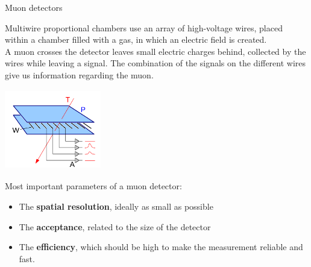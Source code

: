 \documentclass[8 pt]{beamer}
\begin{document}
\begin{frame}{Muon detectors}
\justifying
\begin{minipage}[c]{.58\textwidth}
\justifying
Multiwire proportional chambers use an array of high-voltage wires, placed within a chamber filled with a gas, in which an electric field is created. \\ \vspace{10pt}
A muon crosses the detector leaves small electric charges behind, collected by the wires while leaving a signal. The combination of the signals on the different wires give us information regarding the muon.
\end{minipage} \hfill
\begin{minipage}[c]{.39\textwidth}
\includegraphics[width=4.2cm, height=3.5cm]{figs/wireChambers.png}
\end{minipage} \hfill \vfill

Most important parameters of a muon detector:
\begin{itemize}
\justifying
\item The \textbf{spatial resolution}, ideally as small as possible
\item The \textbf{acceptance}, related to the size of the detector
\item The \textbf{efficiency}, which should be high to make the measurement reliable and fast.
\end{itemize}
\end{frame}
\end{document}
